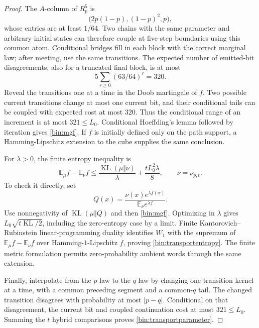 \begin{proof}
The $A$-column of $R_p^5$ is
\[
 \bigl(2p(1-p),(1-p)^2,p\bigr),
\]
whose entries are at least $1/64$. Two chains with the same parameter and arbitrary initial states can therefore couple at five-step boundaries using this common atom. Conditional bridges fill in each block with the correct marginal law; after meeting, use the same transitions. The expected number of emitted-bit disagreements, also for a truncated final block, is at most
\[
 5\sum_{r\ge0}(63/64)^r=320.
\]
Reveal the transitions one at a time in the Doob martingale of $f$. Two possible current transitions change at most one current bit, and their conditional tails can be coupled with expected cost at most $320$. Thus the conditional range of an increment is at most $321\le L_0$. Conditional Hoeffding's lemma followed by iteration gives \eqref{bin:mgf}. If $f$ is initially defined only on the path support, a Hamming-Lipschitz extension to the cube supplies the same conclusion.

For $\lambda>0$, the finite entropy inequality is
\[
 \mathbb E_\mu f-\mathbb E_\nu f
 \le\frac{\operatorname{KL}(\mu\Vert\nu)}\lambda
       +\frac{tL_0^2\lambda}{8},\qquad\nu=\nu_{p,t}.
\]
To check it directly, set
\[
 Q(x)=\frac{\nu(x)e^{\lambda f(x)}}{\mathbb E_\nu e^{\lambda f}}.
\]
Use nonnegativity of $\operatorname{KL}(\mu\Vert Q)$ and then \eqref{bin:mgf}. Optimizing in $\lambda$ gives $L_0\sqrt{t\operatorname{KL}/2}$, including the zero-entropy case by a limit. Finite Kantorovich--Rubinstein linear-programming duality identifies $W_1$ with the supremum of $\mathbb E_\mu f-\mathbb E_\nu f$ over Hamming-$1$-Lipschitz $f$, proving \eqref{bin:transportentropy}. The finite metric formulation permits zero-probability ambient words through the same extension.

Finally, interpolate from the $p$ law to the $q$ law by changing one transition kernel at a time, with a common preceding segment and a common-$q$ tail. The changed transition disagrees with probability at most $|p-q|$. Conditional on that disagreement, the current bit and coupled continuation cost at most $321\le L_0$. Summing the $t$ hybrid comparisons proves \eqref{bin:transportparameter}.
\end{proof}

